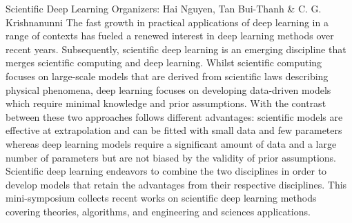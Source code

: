 \label{mini26}


\miniabs
{Scientific Deep Learning}
{Organizers: Hai Nguyen, Tan Bui-Thanh \& C. G. Krishnanunni}
{The fast growth in practical applications of deep learning in a range of contexts has fueled a renewed interest in deep learning methods over recent years. Subsequently, scientific deep learning is an emerging discipline that merges scientific computing and deep learning. Whilst scientific computing focuses on large-scale models that are derived from scientific laws describing physical phenomena, deep learning focuses on developing data-driven models which require minimal knowledge and prior assumptions. With the contrast between these two approaches follows different advantages: scientific models are effective at extrapolation and can be fitted with small data and few parameters whereas deep learning models require a significant amount of data and a large number of parameters but are not biased by the validity of prior assumptions. Scientific deep learning endeavors to combine the two disciplines in order to develop models that retain the advantages from their respective disciplines. This mini-symposium collects recent works on scientific deep learning methods covering theories, algorithms, and engineering and sciences applications.}

